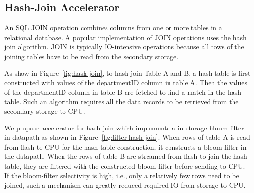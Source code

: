\documentclass{article}
\begin{document}
\subsection{Hash-Join Accelerator}
An SQL JOIN operation combines columns from one or more tables in a relational database.
A popular implementation of JOIN operations uses the hash join algorithm.
JOIN is typically IO-intensive operations because all rows of the joining tables have to be read from the secondary storage.

As show in Figure~\ref{fig:hash-join}, to hash-join Table A and B, a hash table is first constructed with values of the departmentID column in table A.
Then the values of the departmentID column in table B are fetched to find a match in the hash table.
Such an algorithm requires all the data records to be retrieved from the secondary storage to CPU.

We propose accelerator for hash-join which implements a in-storage bloom-filter in datapath as shown in Figure~\ref{fig:filter-hash-join}.
When rows of table A is read from flash to CPU for the hash table construction, it constructs a bloom-filter in the datapath.
When the rows of table B are streamed from flash to join the hash table, they are filtered with the constructed bloom filter before sending to CPU.
If the bloom-filter selectivity is high, i.e., only a relatively few rows need to be joined, such a mechanism can greatly reduced required IO from storage to CPU.
\end{document}
